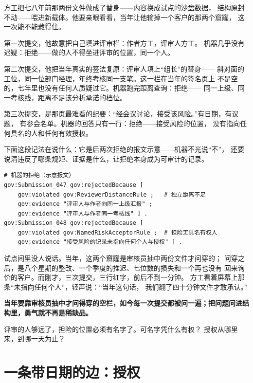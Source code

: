 方工把七八年前那两份文件做成了替身——内容换成试点的沙盘数据，
结构原封不动——喂进新载体。他要亲眼看看，当年让他输掉一个客户的那两个窟窿，
这一次能不能藏得住。

第一次提交，他故意把自己填进评审栏：作者方工，评审人方工。
机器几乎没有迟疑：拒绝——做的人不得坐进评审的位置，同一个人。

第二次提交，他把当年真实的签法复原：评审人填上“组长”的替身——
斜对面的工位，同一位部门经理，年终考核同一支笔。这一栏在当年的签名页上
不是空的，七年里也没有任何人质疑过它。机器跑完距离查询：拒绝——
同一上级、同一考核线，距离不足该分析承诺的档位。

第三次提交，是那页最难看的纪要：“经会议讨论，接受该风险。”有日期，有议题，
有参会名单。机器的回答只有一行：拒绝——接受风险的位置，
没有指向任何具名的人和任何有效授权。

下面这段记法在说什么：它是后两次拒绝的报文示意——机器不光说“不”，
还要说清违反了哪条规矩、证据是什么，让拒绝本身成为可审计的记录。

\nopagebreak[4]
\begin{codebox}
\begin{Verbatim}[fontsize=\small,breaklines=true,breakanywhere=true,breaksymbolleft={},breaksymbolright={}]
# 机器的拒绝（示意报文）
gov:Submission_047 gov:rejectedBecause [
    gov:violated gov:ReviewerDistanceRule ;   # 独立距离不足
    gov:evidence "评审人与作者向同一上级汇报" ;
    gov:evidence "评审人与作者同一考核线" ] .
gov:Submission_048 gov:rejectedBecause [
    gov:violated gov:NamedRiskAcceptorRule ;  # 担险无具名有权人
    gov:evidence "接受风险的记录未指向任何个人与授权" ] .
\end{Verbatim}
\end{codebox}

试点间里没人说话。当年，这两个窟窿是审核员抽中两份文件才问穿的；
问穿之后，是八个星期的整改、一个季度的推迟、七位数的损失和一个再也没有
回来询价的客户。而刚才，三次提交，三行红字，前后不到一分钟。
方工看着屏幕上那条“未指向任何个人”，轻声说：“当年这句话，
我们翻了四十分钟文件才敢承认。”

\textbf{当年要靠审核员抽中才问得穿的空栏，如今每一次提交都被问一遍；把问题问进结构里，勇气就不再是稀缺品。}

评审的人够远了，担险的位置必须有名字了。可名字凭什么有权？
授权从哪里来，到哪一天为止？

\section{一条带日期的边：授权}


